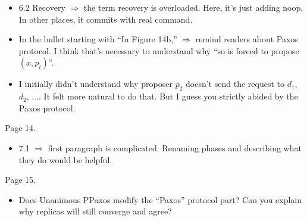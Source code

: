 \documentclass[letterpaper,twocolumn,10pt]{article}
\newenvironment{reviewerquote}
{\list{}{\leftmargin=\parindent\rightmargin=0in}\item[] \itshape \color{ReviewerDarkGray}}%
{\endlist}
\begin{document}
\begin{reviewerquote}
  \begin{itemize}
    \item
      6.2 Recovery $\Rightarrow$ the term recovery is overloaded. Here, it's
      just adding noop. In other places, it commits with real command.
  \end{itemize}

  \begin{itemize}
    \item
      In the bullet starting with ``In Figure 14b,'' $\Rightarrow$ remind
      readers about Paxos protocol. I think that's necessary to understand why
      ``so is forced to propose $(x, p_i)$''.
  \end{itemize}

  \begin{itemize}
    \item
      I initially didn't understand why proposer $p_2$ doesn't send the request
      to $d_1$, $d_2$, $\ldots$. It felt more natural to do that. But I guess
      you strictly abided by the Paxos protocol.
  \end{itemize}

  Page 14.

  \begin{itemize}
    \item
      7.1 $\Rightarrow$ first paragraph is complicated. Renaming phases and
      describing what they do would be helpful.
  \end{itemize}

  Page 15.

  \begin{itemize}
    \item
      Does Unanimous PPaxos modify the ``Paxos'' protocol part? Can you explain
      why replicas will still converge and agree?
  \end{itemize}
\end{reviewerquote}
\end{document}
